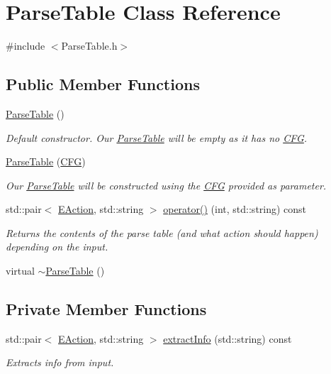 \hypertarget{classParseTable}{\section{Parse\-Table Class Reference}
\label{classParseTable}
}


{\ttfamily \#include $<$Parse\-Table.\-h$>$}

\subsection*{Public Member Functions}
\begin{DoxyCompactItemize}
\item 
\hyperlink{classParseTable_acacf41ffea967138a7eb200a1d03c0bf}{Parse\-Table} ()
\begin{DoxyCompactList}\small\item\em Default constructor. Our \hyperlink{classParseTable}{Parse\-Table} will be empty as it has no \hyperlink{classCFG}{C\-F\-G}. \end{DoxyCompactList}\item 
\hyperlink{classParseTable_a71107a2b7d2b83142a31d08d9e960fee}{Parse\-Table} (\hyperlink{classCFG}{C\-F\-G})
\begin{DoxyCompactList}\small\item\em Our \hyperlink{classParseTable}{Parse\-Table} will be constructed using the \hyperlink{classCFG}{C\-F\-G} provided as parameter. \end{DoxyCompactList}\item 
std\-::pair$<$ \hyperlink{ParseTable_8h_a81d4868b129e5f45325894085a36a8a5}{E\-Action}, std\-::string $>$ \hyperlink{classParseTable_a276cf2fa3182cff81da31ce69c26a30c}{operator()} (int, std\-::string) const 
\begin{DoxyCompactList}\small\item\em Returns the contents of the parse table (and what action should happen) depending on the input. \end{DoxyCompactList}\item 
virtual \hyperlink{classParseTable_aa3c8f1c8313c216e39388ec0bd64afc6}{$\sim$\-Parse\-Table} ()
\end{DoxyCompactItemize}
\subsection*{Private Member Functions}
\begin{DoxyCompactItemize}
\item 
std\-::pair$<$ \hyperlink{ParseTable_8h_a81d4868b129e5f45325894085a36a8a5}{E\-Action}, std\-::string $>$ \hyperlink{classParseTable_a67d59fa53fbc3136cc8ad6e20c7edf87}{extract\-Info} (std\-::string) const 
\begin{DoxyCompactList}\small\item\em Extracts info from input. \end{DoxyCompactList}\end{DoxyCompactItemize}
